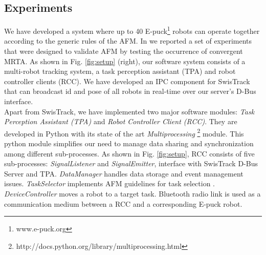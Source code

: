 \documentclass{ifacconf}
\begin{document}
\subsection{Experiments}
We have developed a system where up to 40 E-puck\footnote{www.e-puck.org} robots can operate together according to the generic rules of the AFM. In \cite{Sarker+2010ants} we reported a set of experiments that were designed to validate AFM by testing the occurrence of convergent MRTA.  As shown in Fig. \ref{fig:setup} (right), our software system consists of a multi-robot tracking system, a task perception assistant (TPA) and robot controller clients (RCC). We have developed an IPC component for SwisTrack that can broadcast id and pose of all robots in real-time over our server's D-Bus interface.\\
Apart from SwisTrack, we have implemented two major software modules: {\em Task Perception Assistant (TPA)} and {\em Robot Controller Client (RCC)}. They are developed in Python with its state of the art \textit{Multiprocessing} \footnote{http://docs.python.org/library/multiprocessing.html} module. This python module simplifies our need to manage data sharing and synchronization among different sub-processes. As shown in Fig. \ref{fig:setup}, RCC consists of five sub-processes: {\em SignalListener} and {\em SignalEmitter}, interface with SwisTrack D-Bus Server and TPA. {\em DataManager} handles data storage and event management issues. {\em TaskSelector} implements AFM guidelines for task selection . {\em DeviceController} moves a robot to a target task. Bluetooth radio link is used as a communication medium between a RCC and a corresponding E-puck robot.  
\end{document}
